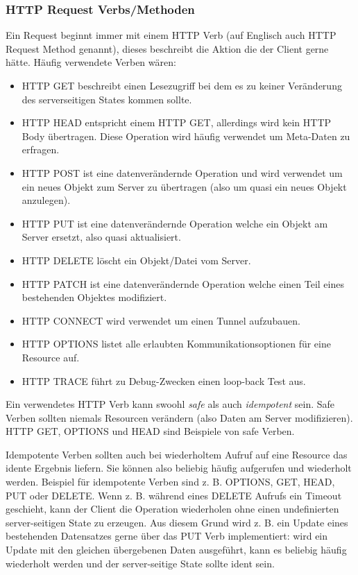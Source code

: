 \subsubsection{HTTP Request Verbs/Methoden}

Ein Request beginnt immer mit einem HTTP Verb (auf Englisch auch HTTP Request Method genannt), dieses beschreibt die Aktion die der Client gerne hätte. Häufig verwendete Verben wären:

\begin{itemize}
	\item HTTP GET beschreibt einen Lesezugriff bei dem es zu keiner Veränderung des serverseitigen States kommen sollte.
	\item HTTP HEAD entspricht einem HTTP GET, allerdings wird kein HTTP Body übertragen. Diese Operation wird häufig verwendet um Meta-Daten zu erfragen.
	\item HTTP POST ist eine datenverändernde Operation und wird verwendet um ein neues Objekt zum Server zu übertragen (also um quasi ein neues Objekt anzulegen).
	\item HTTP PUT ist eine datenverändernde Operation welche ein Objekt am Server ersetzt, also quasi aktualisiert.
	\item HTTP DELETE löscht ein Objekt/Datei vom Server.
	\item HTTP PATCH ist eine datenverändernde Operation welche einen Teil eines bestehenden Objektes modifiziert.
	\item HTTP CONNECT wird verwendet um einen Tunnel aufzubauen.
	\item HTTP OPTIONS listet alle erlaubten Kommunikationsoptionen für eine Resource auf.
	\item HTTP TRACE führt zu Debug-Zwecken einen loop-back Test aus.
\end{itemize}

Ein verwendetes HTTP Verb kann swoohl \textit{safe} als auch \textit{idempotent} sein. Safe Verben sollten niemals Resourcen verändern (also Daten am Server modifizieren). HTTP GET, OPTIONS und HEAD sind Beispiele von safe Verben.

Idempotente Verben sollten auch bei wiederholtem Aufruf auf eine Resource das idente Ergebnis liefern. Sie können also beliebig häufig aufgerufen und wiederholt werden. Beispiel für idempotente Verben sind z. B. OPTIONS, GET, HEAD, PUT oder DELETE. Wenn z. B. während eines DELETE Aufrufs ein Timeout geschieht, kann der Client die Operation wiederholen ohne einen undefinierten server-seitigen State zu erzeugen. Aus diesem Grund wird z. B. ein Update eines bestehenden Datensatzes gerne über das PUT Verb implementiert: wird ein Update mit den gleichen übergebenen Daten ausgeführt, kann es beliebig häufig wiederholt werden und der server-seitige State sollte ident sein.

